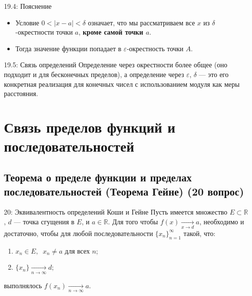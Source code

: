 \documentclass[a4paper,12pt]{article}
\begin{document}
\begin{center}
	\end{center}
	
	\begin{remarkbox}{19.4: Пояснение}
		\begin{itemize}
			\item Условие $0 < |x - a| < \delta$ означает, что мы рассматриваем все $x$ из $\delta$-окрестности точки $a$, \textbf{кроме самой точки $a$}.
			\item Тогда значение функции попадает в $\varepsilon$-окрестность точки $A$.
		\end{itemize}
	\end{remarkbox}
	
	\begin{notebook}{19.5: Связь определений}
		Определение через окрестности более общее (оно подходит и для бесконечных пределов), а определение через $\varepsilon$, $\delta$ — это его конкретная реализация для конечных чисел с использованием модуля как меры расстояния.
	\end{notebook}
	
	
	
	
	
	
	
	
	
	\newpage
	\section{Связь пределов функций и последовательностей}
	
	\subsection{Теорема о пределе функции и пределах последовательностей (Теорема Гейне) (20 вопрос)}
	
	\begin{theorembox}{20: Эквивалентность определений Коши и Гейне}
		Пусть имеется множество $E \subset \mathbb{R}$, $d$ --- точка сгущения в $E$, и $a \in \mathbb{R}$. Для того чтобы $f(x) \xrightarrow[x \to d]{} a$, необходимо и достаточно, чтобы для любой последовательности $\{x_n\}_{n=1}^{\infty}$ такой, что:
		\begin{enumerate}
			\item $x_n \in E, \;\; x_n \neq a$ для всех $n$;
			\item $\{x_n\} \xrightarrow[n \to \infty]{} d$;
		\end{enumerate}
		выполнялось $f(x_n) \xrightarrow[n \to \infty]{} a$.
	\end{theorembox}
	
\end{document}
